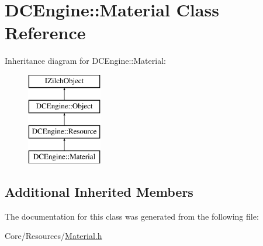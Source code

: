 \hypertarget{classDCEngine_1_1Material}{\section{D\-C\-Engine\-:\-:Material Class Reference}
\label{classDCEngine_1_1Material}
}
Inheritance diagram for D\-C\-Engine\-:\-:Material\-:\begin{figure}[H]
\begin{center}
\leavevmode
\includegraphics[height=4.000000cm]{classDCEngine_1_1Material}
\end{center}
\end{figure}
\subsection*{Additional Inherited Members}


The documentation for this class was generated from the following file\-:\begin{DoxyCompactItemize}
\item 
Core/\-Resources/\hyperlink{Material_8h}{Material.\-h}\end{DoxyCompactItemize}
